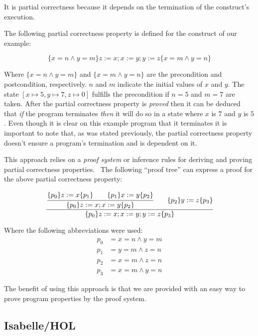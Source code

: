 It is partial correctness because it depends on the termination of the construct's execution.~\parencite{nipkow}


The following partial correctness property is defined for the construct of our example:

\begin{equation*}
\lbrace x=n \land y=m \rbrace z:=x; x:=y; y:=z \lbrace x=m \land y=n \rbrace
\end{equation*}

Where $\lbrace x=n \land y=m \rbrace $ and $\lbrace x=m \land y=n \rbrace $ are the precondition and postcondition, respectively.
$n$ and $m$ indicate the initial values of $x$ and $y$.
The state $[x\mapsto5, y\mapsto7, z\mapsto0]$ fulfills the precondition if $n=5$ and $m=7$ are taken.
After the partial correctness property is \textit{proved} then it can be deduced that \textit{if} the program terminates \textit{then} it will do so in a state where $x$ is $7$ and $y$ is $5$.
Even though it is clear on this example program that it terminates it is important to note that, as was stated previously, the partial correctness property doesn't ensure a program's termination and is dependent on it.

This approach relies on a \textit{proof system} or inference rules for deriving and proving partial correctness properties.~\parencite{nipkow}
The following ``proof tree'' can express a proof for the above partial correctness property:

\begin{equation*}
\cfrac{
  \cfrac{ \lbrace p_{0} \rbrace z:=x \lbrace p_{1} \rbrace \qquad \lbrace p_{1} \rbrace x:=y \lbrace p_{2} \rbrace }
    { \lbrace p_{0} \rbrace z:=x; x:=y \lbrace p_{2} \rbrace }
  \qquad
 \lbrace p_{2} \rbrace y:=z \lbrace p_{3} \rbrace
  }
  { \lbrace p_{0} \rbrace z:=x; x:=y; y:=z \lbrace p_{3} \rbrace }
\end{equation*}

Where the following abbreviations were used:
\begin{align*}
p_{0} &= x=n \land y=m\\
p_{1} &= y=m \land z=n\\
p_{2} &= x=m \land z=n\\
p_{3} &= x=m \land y=n
\end{align*}

The benefit of using this approach is that we are provided with an easy way to prove program properties by the proof system.


\subsection{Isabelle/HOL}\label{section:isabelle/hol}

